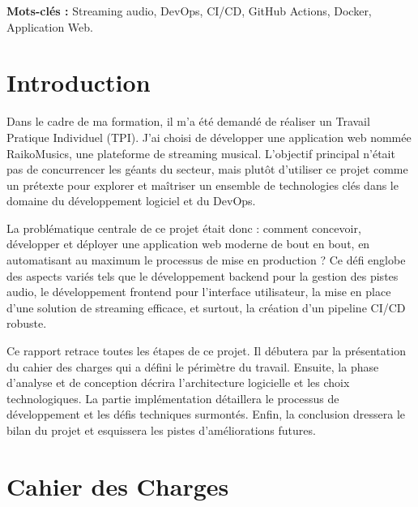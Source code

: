 \documentclass[12pt,a4paper]{article} %
\begin{document}
\vspace{1cm}
\textbf{Mots-clés :} Streaming audio, DevOps, CI/CD, GitHub Actions, Docker, Application Web.

\newpage
\renewcommand*\contentsname{Table des matières}
{
    \hypersetup{linkcolor=black} %
    \tableofcontents
}
\newpage
{} %


\section{Introduction}

Dans le cadre de ma formation, il m'a été demandé de réaliser un Travail Pratique Individuel (TPI). J'ai choisi de développer une application web nommée RaikoMusics, une plateforme de streaming musical. L'objectif principal n'était pas de concurrencer les géants du secteur, mais plutôt d'utiliser ce projet comme un prétexte pour explorer et maîtriser un ensemble de technologies clés dans le domaine du développement logiciel et du DevOps.

La problématique centrale de ce projet était donc : comment concevoir, développer et déployer une application web moderne de bout en bout, en automatisant au maximum le processus de mise en production ? Ce défi englobe des aspects variés tels que le développement backend pour la gestion des pistes audio, le développement frontend pour l'interface utilisateur, la mise en place d'une solution de streaming efficace, et surtout, la création d'un pipeline CI/CD robuste.

Ce rapport retrace toutes les étapes de ce projet. Il débutera par la présentation du cahier des charges qui a défini le périmètre du travail. Ensuite, la phase d'analyse et de conception décrira l'architecture logicielle et les choix technologiques. La partie implémentation détaillera le processus de développement et les défis techniques surmontés. Enfin, la conclusion dressera le bilan du projet et esquissera les pistes d'améliorations futures.

\section{Cahier des Charges}
\end{document}
